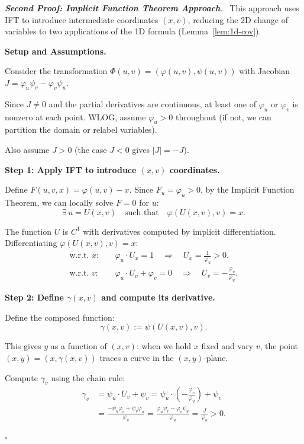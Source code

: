 \documentclass[11pt]{report}
\renewenvironment{proof}[1][Proof]{\par\noindent\textit{#1.}\ }{\hfill$\square$\par\medskip}
\begin{document}
\begin{proof}[\textbf{Second Proof: Implicit Function Theorem Approach}]
This approach uses IFT to introduce intermediate coordinates $(x, v)$, reducing the 2D change of variables to two applications of the 1D formula (Lemma~\ref{lem:1d-cov}).

\textbf{Setup and Assumptions.}

Consider the transformation $\Phi(u, v) = (\varphi(u, v), \psi(u, v))$ with Jacobian $J = \varphi_u \psi_v - \varphi_v \psi_u$.

Since $J \neq 0$ and the partial derivatives are continuous, at least one of $\varphi_u$ or $\varphi_v$ is nonzero at each point. WLOG, assume $\varphi_u > 0$ throughout (if not, we can partition the domain or relabel variables).

Also assume $J > 0$ (the case $J < 0$ gives $|J| = -J$).

\textbf{Step 1: Apply IFT to introduce $(x, v)$ coordinates.}

Define $F(u, v, x) = \varphi(u, v) - x$. Since $F_u = \varphi_u > 0$, by the Implicit Function Theorem, we can locally solve $F = 0$ for $u$:
\[
\exists \, u = U(x, v) \quad \text{such that} \quad \varphi(U(x, v), v) = x.
\]

The function $U$ is $C^1$ with derivatives computed by implicit differentiation. Differentiating $\varphi(U(x,v), v) = x$:
\begin{align*}
\text{w.r.t. } x: \quad & \varphi_u \cdot U_x = 1 \quad \Longrightarrow \quad U_x = \frac{1}{\varphi_u} > 0. \\
\text{w.r.t. } v: \quad & \varphi_u \cdot U_v + \varphi_v = 0 \quad \Longrightarrow \quad U_v = -\frac{\varphi_v}{\varphi_u}.
\end{align*}

\textbf{Step 2: Define $\gamma(x, v)$ and compute its derivative.}

Define the composed function:
\[
\gamma(x, v) := \psi(U(x, v), v).
\]

This gives $y$ as a function of $(x, v)$: when we hold $x$ fixed and vary $v$, the point $(x, y) = (x, \gamma(x, v))$ traces a curve in the $(x, y)$-plane.

Compute $\gamma_v$ using the chain rule:
\begin{align*}
\gamma_v &= \psi_u \cdot U_v + \psi_v = \psi_u \cdot \left( -\frac{\varphi_v}{\varphi_u} \right) + \psi_v \\
&= \frac{-\psi_u \varphi_v + \psi_v \varphi_u}{\varphi_u} = \frac{\varphi_u \psi_v - \varphi_v \psi_u}{\varphi_u} = \frac{J}{\varphi_u} > 0.
\end{align*}


\end{proof}
\end{document}
